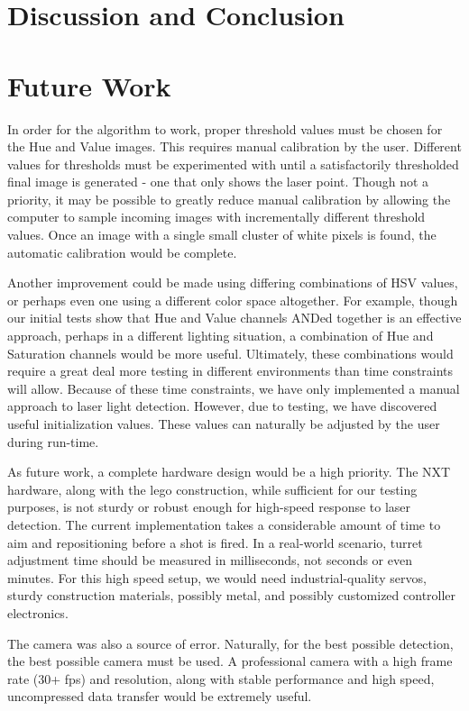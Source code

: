 \documentclass[10pt,twocolumn,letterpaper]{article}
\begin{document}
\section{Discussion and Conclusion}


\section{Future Work}

In order for the algorithm to work, proper threshold values must be chosen for the Hue and Value images.  This requires manual calibration by the user.  Different values for thresholds must be experimented with until a satisfactorily thresholded final image is generated - one that only shows the laser point.  Though not a priority, it may be possible to greatly reduce manual calibration by allowing the computer to sample incoming images with incrementally different threshold values.  Once an image with a single small cluster of white pixels is found, the automatic calibration would be complete.

Another improvement could be made using differing combinations of HSV values, or perhaps even one using a different color space altogether.  For example, though our initial tests show that Hue and Value channels ANDed together is an effective approach, perhaps in a different lighting situation, a combination of Hue and Saturation channels would be more useful.  Ultimately, these combinations would require a great deal more testing in different environments than time constraints will allow.  Because of these time constraints, we have only implemented a manual approach to laser light detection.  However, due to testing, we have discovered useful initialization values.  These values can naturally be adjusted by the user during run-time.

As future work, a complete hardware design would be a high priority.  The NXT hardware, along with the lego construction, while sufficient for our testing purposes, is not sturdy or robust enough for high-speed response to laser detection.  The current implementation takes a considerable amount of time to aim and repositioning before a shot is fired.  In a real-world scenario, turret adjustment time should be measured in milliseconds, not seconds or even minutes.  For this high speed setup, we would need industrial-quality servos, sturdy construction materials, possibly metal, and possibly customized controller electronics.

The camera was also a source of error.  Naturally, for the best possible detection, the best possible camera must be used.  A professional camera with a high frame rate (30+ fps) and resolution, along with stable performance and high speed, uncompressed data transfer would be extremely useful.
\end{document}
